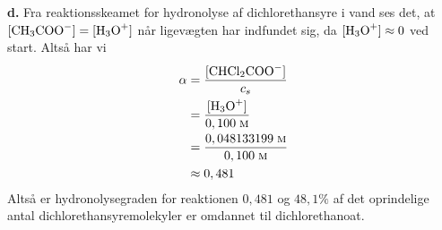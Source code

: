 \documentclass{report}
\begin{document}
\textbf{d.}
Fra reaktionsskeamet for hydronolyse af dichlorethansyre i vand ses det, at $[\ce{CH3COO-} ]=[\ce{H3O+} ]$ når ligevægten har indfundet sig, da $[\ce{H3O+} ]\approx 0$ ved start. 
Altså har vi
\begin{equation*}
\begin{split}
  \alpha&=\frac{[\ce{CHCl2COO-} ]}{c_s}\\ 
  &= \frac{[\ce{H3O+} ]}{0,100 \;\unit{\textsc{m}} } \\
  &=\frac{0,048133199 \;\unit{\textsc{m}} }{0,100 \;\unit{\textsc{m}} }\\ 
  &\approx 0,481
\end{split}
\end{equation*}
Altså er hydronolysegraden for reaktionen $0,481$ og $48,1 \%$ af det oprindelige antal dichlorethansyremolekyler er omdannet til dichlorethanoat. 
\end{document}
